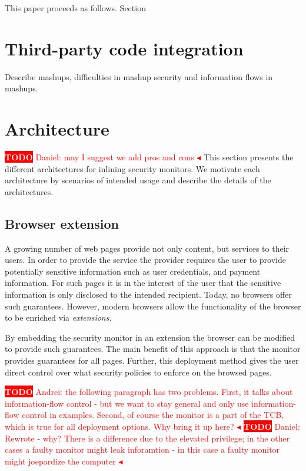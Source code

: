 \documentclass{llncs}
\newcommand{\todo}[1]{\colorbox{red}{\textcolor{white}{\sffamily\bfseries\scriptsize TODO}} \textcolor{red}{#1} \textcolor{red}{$\blacktriangleleft$}}
\begin{document}
This paper proceeds as follows. Section~


\section{Third-party code integration}
\label{sec:mash}

Describe mashups, difficulties in mashup security and information flows in mashups.

\section{Architecture}
\label{sec:arch}

\todo{Daniel: may I suggest we add pros and cons}
This section presents the different architectures for inlining
security monitors. We motivate each architecture by scenarios of
intended usage and describe the details of the architectures.




\subsection{Browser extension}

A growing number of web pages provide not only content, but services to their
users. In order to provide the service the provider requires the user to
provide potentially sensitive information such as user credentials, and payment
information. For such pages it is in the interest of the user that the
sensitive information is only disclosed to the intended recipient.  Today, no
browsers offer such guarantees. However, modern browsers allow the
functionality of the browser to be enriched via \emph{extensions}. 

By embedding the security monitor in an extension the browser can be modified
to provide such guarantees. The main benefit of this approach is that the
monitor provides guarantees for all pages. Further, this deployment method
gives the user direct control over what security policies to enforce on the
browsed pages.

\todo{Andrei: the following paragraph has two problems. First, it
  talks about information-flow control - but we want to stay general
  and only use information-flow control in examples. Second, of course
the monitor is a part of the TCB, which is true for all deployment
options. Why bring it up here?}
\todo{Daniel: Rewrote - why? There is a difference due to the elevated privilege; in the
  other cases a faulty monitor might leak inforamtion - in this case a faulty
  monitor might joepardize the computer}
\end{document}
